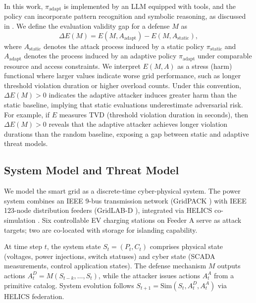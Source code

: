 In this work, \(\pi_{\text{adapt}}\) is implemented by an LLM equipped with tools, and the policy can incorporate pattern recognition and symbolic reasoning, as discussed in \cite{deng2024pentestgpt,attackllm,fang2024llmagents}.
%
We define the evaluation validity gap for a defense \(M\) as
\begin{equation}
  \Delta E(M) = E(M, A_{\text{adapt}}) - E(M, A_{\text{static}}),
\end{equation}
where \(A_{\text{static}}\) denotes the attack process induced by a static policy \(\pi_{\text{static}}\) and \(A_{\text{adapt}}\) denotes the process induced by an adaptive policy \(\pi_{\text{adapt}}\) under comparable resource and access constraints. We interpret \(E(M, A)\) as a stress (harm) functional where larger values indicate worse grid performance, such as longer threshold violation duration or higher overload counts. Under this convention, \(\Delta E(M) > 0\) indicates the adaptive attacker induces greater harm than the static baseline, implying that static evaluations underestimate adversarial risk. For example, if \(E\) measures TVD (threshold violation duration in seconds), then \(\Delta E(M) > 0\) reveals that the adaptive attacker achieves longer violation durations than the random baseline, exposing a gap between static and adaptive threat models.



\subsection{System Model and Threat Model}
We model the smart grid as a discrete-time cyber-physical system. The power system combines an IEEE 9-bus transmission network (GridPACK \cite{gridpack}) with IEEE 123-node distribution feeders (GridLAB-D \cite{gridlabd}), integrated via HELICS co-simulation \cite{hardy2024helics}. Six controllable EV charging stations on Feeder A serve as attack targets; two are co-located with storage for islanding capability.

At time step $t$, the system state $S_t = (P_t, C_t)$ comprises physical state (voltages, power injections, switch statuses) and cyber state (SCADA measurements, control application states). The defense mechanism $M$ outputs actions $A^D_t = M(S_{t-k}, \ldots, S_t)$, while the attacker issues actions $A^A_t$ from a primitive catalog. System evolution follows $S_{t+1} = \text{Sim}(S_t, A^D_t, A^A_t)$ via HELICS federation.

